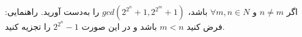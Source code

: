 \EXERCISE
اگر
$n \neq m$
و
$\forall m, n \in N$
باشد،
$gcd(2^{2^n} + 1, 2^{2^m} + 1)$
را به‌دست آورید. راهنمایی: فرض کنید
$m < n$
باشد و در این صورت
$2^{2^n} - 1$
را تجزیه کنید.